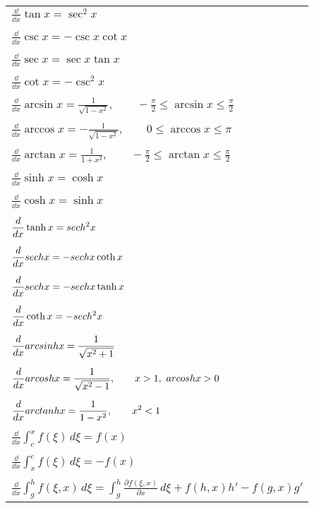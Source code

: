 \begin{longtable}{l}
  $\displaystyle \frac{\dd}{\dd x} \tan x = \sec^2 x$ \\
  \\
  $\displaystyle \frac{\dd}{\dd x} \csc x = - \csc x \cot x$ \\
  \\
  $\displaystyle \frac{\dd}{\dd x} \sec x = \sec x \tan x$ \\
  \\
  $\displaystyle \frac{\dd}{\dd x} \cot x = - \csc^2 x$ \\ 
  \\
  $\displaystyle \frac{\dd}{\dd x} \arcsin x = \frac{1}{\sqrt{1-x^2}}, \qquad
  -\frac{\pi}{2} \leq \arcsin x \leq \frac{\pi}{2}$ \\
  \\
  $\displaystyle \frac{\dd}{\dd x} \arccos x = - \frac{1}{\sqrt{1-x^2}}, \qquad
  0 \leq \arccos x \leq \pi$ \\
  \\
  $\displaystyle \frac{\dd}{\dd x} \arctan x = \frac{1}{1+x^2}, \qquad
  -\frac{\pi}{2} \leq \arctan x \leq \frac{\pi}{2}$ \\
  \\
  $\displaystyle \frac{\dd}{\dd x} \sinh x = \cosh x$ \\
  \\
  $\displaystyle \frac{\dd}{\dd x} \cosh x = \sinh x$ \\
  \\
  $\displaystyle \frac{d}{d x} \tanh x = sech^2 x$ \\
  \\
  $\displaystyle \frac{d}{d x} sech x = - sech x \coth x$ \\
  \\
  $\displaystyle \frac{d}{d x} sech x = - sech x \tanh x$ \\
  \\
  $\displaystyle \frac{d}{d x} \coth x = - sech^2 x$ \\
  \\
  $\displaystyle \frac{d}{d x} arcsinh x = \frac{1}{\sqrt{x^2+1}}$ \\
  \\
  $\displaystyle \frac{d}{d x} arcosh x = \frac{1}{\sqrt{x^2-1}}, \qquad
  x > 1,\ arcosh x > 0$ \\
  \\
  $\displaystyle \frac{d}{d x} arctanh x = \frac{1}{1-x^2}, \qquad
  x^2 < 1$ \\
  \\
  $\displaystyle \frac{\dd}{\dd x} \int_c^x f(\xi)\,d\xi = f(x)$ \\
  \\
  $\displaystyle \frac{\dd}{\dd x} \int_x^c f(\xi)\,d\xi = - f(x)$ \\
  \\
  $\displaystyle \frac{\dd}{\dd x} \int_g^h f(\xi,x)\,d\xi 
  = \int_g^h \frac{\partial f(\xi,x)}{\partial x}\,d\xi + f(h,x) h' - f(g,x) g'$
\end{longtable}










